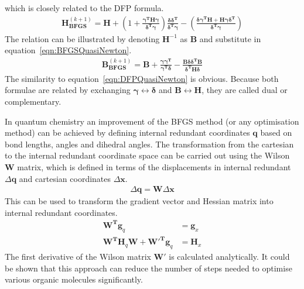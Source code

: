 which is closely related to the \ac{DFP} formula.
%
\begin{align}
    \mathbf{H}_\mathbf{BFGS}^{(k+1)}=\mathbf{H}
    +\left(1+\frac{\bm{\gamma}^\mathbf{T}\mathbf{H}\bm{\gamma}}{\bm{\delta}^\mathbf{T}\bm{\gamma}}\right)
    \frac{\bm{\delta\delta}^\mathbf{T}}{\bm{\delta}^\mathbf{T}\bm{\gamma}}
    -\left(\frac{\bm{\delta\gamma}^\mathbf{T}\mathbf{H}+\mathbf{H}\bm{\gamma\delta}^\mathbf{T}}{\bm{\delta}^\mathbf{T}\bm{\gamma}}\right)\label{eqn:BFGSQuasiNewton}
\end{align}
%
The relation can be illustrated by denoting $\mathbf{H}^{-1}$ as $\mathbf{B}$
and substitute in equation~\eqref{eqn:BFGSQuasiNewton}.
%
\begin{align}
    \mathbf{B}_\mathbf{BFGS}^{(k+1)}=\mathbf{B}+\frac{\bm{\gamma\gamma}^\mathbf{T}}{\bm{\gamma}^\mathbf{T}\bm{\delta}}
    -\frac{\mathbf{B}\bm{\delta\delta}^\mathbf{T}\mathbf{B}}{\bm{\delta}^\mathbf{T}\mathbf{H}\bm{\delta}}
\end{align}
%
The similarity to equation~\eqref{eqn:DFPQuasiNewton} is obvious. Because both
formulae are related by exchanging $\bm{\gamma}\leftrightarrow\bm{\delta}$ and
$\mathbf{B}\leftrightarrow\mathbf{H}$, they are called dual or complementary.

In quantum chemistry an improvement of the \ac{BFGS} method (or any
optimisation method) can be achieved by defining internal redundant coordinates
$\mathbf{q}$ based on bond lengths, angles and dihedral
angles.\autocite{Pulay_Systematicinitiogradient_1979,Pulay_Geometryoptimizationredundant_1992,Fogarasi_calculationinitiomolecular_1992}
The transformation from the cartesian to the internal redundant coordinate
space can be carried out using the Wilson $\mathbf{W}$ matrix, which is defined
in terms of the displacements in internal redundant $\Delta \mathbf{q}$ and
cartesian coordinates $\Delta\mathbf{x}$.
%
\begin{align}
    \Delta \mathbf{q} = \mathbf{W} \Delta \mathbf{x}
\end{align}
%
This can be used to transform the gradient vector and Hessian matrix into
internal redundant coordinates.
%
\begin{align}
    \mathbf{W^T}\mathbf{g}_q &= \mathbf{g}_x\\
    \mathbf{W^T}\mathbf{H}_q\mathbf{W} + \mathbf{W'^{T}}\mathbf{g}_q &= \mathbf{H}_x 
\end{align}
%
The first derivative of the Wilson matrix $\mathbf{W}'$ is calculated
analytically. It could be shown that this approach can reduce the
number of steps needed to optimise various organic molecules significantly.\autocite{Peng_Usingredundantinternal_1996}

